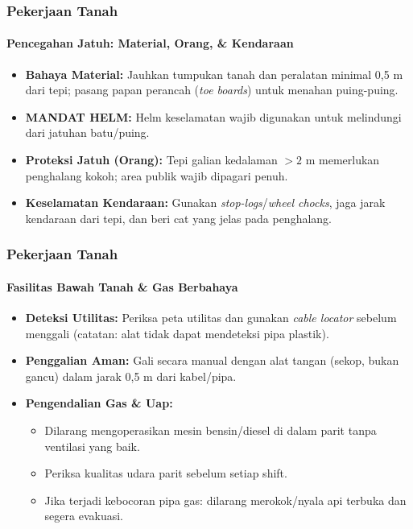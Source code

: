 \documentclass[../main.tex]{subfiles}
\begin{document}
\begin{frame}[mytitle=imageplus,t,mycolor=white,light]
	\frametitle{Pekerjaan Tanah}
	\framesubtitle{Pencegahan Jatuh: Material, Orang, \& Kendaraan}
	\begin{itemize}
		\item \textbf{Bahaya Material:} Jauhkan tumpukan tanah dan peralatan minimal 0,5 m dari tepi; pasang papan perancah (\textit{toe boards}) untuk menahan puing-puing.
		\item \textbf{MANDAT HELM:} Helm keselamatan wajib digunakan untuk melindungi dari jatuhan batu/puing.
		\item \textbf{Proteksi Jatuh (Orang):} Tepi galian kedalaman $> 2\text{ m}$ memerlukan penghalang kokoh; area publik wajib dipagari penuh.
		\item \textbf{Keselamatan Kendaraan:} Gunakan \textit{stop-logs}/\textit{wheel chocks}, jaga jarak kendaraan dari tepi, dan beri cat yang jelas pada penghalang.
	\end{itemize}
\end{frame}

\begin{frame}[mytitle=standard,t,mycolor=digiPH_cream,light]
	\frametitle{Pekerjaan Tanah}
	\framesubtitle{Fasilitas Bawah Tanah \& Gas Berbahaya}
	\begin{itemize}
		\item \textbf{Deteksi Utilitas:} Periksa peta utilitas dan gunakan \textit{cable locator} sebelum menggali (catatan: alat tidak dapat mendeteksi pipa plastik).
		\item \textbf{Penggalian Aman:} Gali secara manual dengan alat tangan (sekop, bukan gancu) dalam jarak 0,5 m dari kabel/pipa.
		\item \textbf{Pengendalian Gas \& Uap:}
		      \begin{itemize}
			      \item Dilarang mengoperasikan mesin bensin/diesel di dalam parit tanpa ventilasi yang baik.
			      \item Periksa kualitas udara parit sebelum setiap shift.
			      \item Jika terjadi kebocoran pipa gas: dilarang merokok/nyala api terbuka dan segera evakuasi.
		      \end{itemize}
	\end{itemize}
\end{frame}
\end{document}
